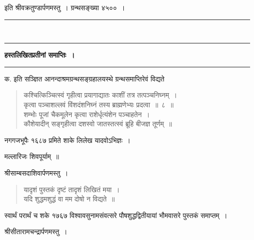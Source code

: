 \documentclass[11pt, openany]{book}
\begin{document}
\begin{sloppypar}
इति श्रीवक्रतुण्डार्पणमस्तु~। ग्रन्थसङ्ख्या ४५००~।

\begin{center}
\rule{0.2\linewidth}{0.8pt}\\
\vspace{-4mm}

\rule{0.2\linewidth}{0.8pt}
\end{center}
\end{sloppypar}

\newpage
\thispagestyle{empty}

\begin{center}
\textbf{\large हस्तलिखितप्रतीनां समाप्तिः~।}\\
\rule{0.3\linewidth}{0.8pt}
\end{center}

\begin{sloppypar}
क. इति सञ्ज्ञित आनन्दाश्रमग्रन्थसङ्ग्रहालयस्थे ग्रन्थसमाप्तिरेवं विद्यते\textendash

\begin{quote}
कश्चित्किञ्चित्स्वं गृहीत्वा प्रयागाद्यातः काशीं तत्र तत्पञ्चनिघ्नम्~।\\
कृत्वा पञ्चाशल्लवं विंशदंशनिघ्नं तस्य ब्राह्मणेभ्यः प्रदत्वा~॥~८~॥\\
शम्भोः पूजां चैकमूलेन कृत्वा राशेर्धृत्यंशेन पञ्चाहतेन~।\\
कौशेयादीन् सङ्गृहीत्वा दशस्वो जातस्तत्स्वं ब्रूहि बीजज्ञ तूर्णम्~॥
\end{quote}

नगगजभूपैः १६८७ प्रमिते शाके लिलेख यादवोऽभिज्ञः~। 
\vspace{2mm}

मल्लारिजः शिवपूर्याम्~॥ 

\begin{center}
श्रीसाम्बसदाशिवार्पणमस्तु~। 
\end{center}
\vspace{-2mm}

\begin{quote}
यादृशं पुस्तकं दृष्टं तादृशं लिखितं मया~। \\
यदि शुद्धमशुद्धं वा मम दोषो न विद्यते~॥ 
\end{quote}

स्वार्थं परार्थं च शके १७६७ विश्वावसुनामसंवत्सरे पौषशुद्धद्वितीयायां भौमवासरे पुस्तकं समाप्तम्~। 

\begin{center}
श्रीसीतारामचन्द्रार्पणमस्तु~। \\
\vspace{1mm}


\end{center}
\end{sloppypar}
\end{document}
